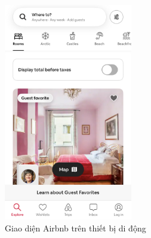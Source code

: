 \begin{figure}[H]
    \centering
    \includegraphics[width=0.5\textwidth]{Images/RelatedSystems/AirbnbMobile.PNG}
    \caption{Giao diện Airbnb trên thiết bị di động}
\end{figure}
